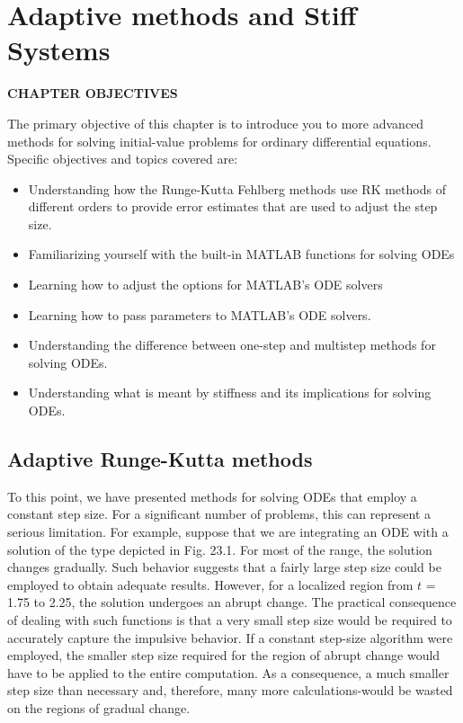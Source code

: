 \documentclass[../main.tex]{subfiles}
\begin{document}
 
\chapter{Adaptive methods and Stiff Systems}\label{chap:chap23}

\begin{center}
    \Large{\textbf{CHAPTER OBJECTIVES}}
\end{center}
The primary objective of this chapter is to introduce you to more advanced methods
for solving initial-value problems for ordinary differential equations. Specific
objectives and topics covered are:
\begin{itemize}
    \item Understanding how the Runge-Kutta Fehlberg methods use RK methods of
    different orders to provide error estimates that are used to adjust the step size.
    \item Familiarizing yourself with the built-in MATLAB functions for solving ODEs
    \item Learning how to adjust the options for MATLAB's ODE solvers
    \item Learning how to pass parameters to MATLAB's ODE solvers.
    \item Understanding the difference between one-step and multistep methods for solving
    ODEs.
    \item Understanding what is meant by stiffness and its implications for solving ODEs.
    \end{itemize}
\vspace{2cm}
\section{Adaptive Runge-Kutta methods}
To this point, we have presented methods for solving ODEs that employ a constant step size.
For a significant number of problems, this can represent a serious limitation. For example,
suppose that we are integrating an ODE with a solution of the type depicted in Fig. 23.1. For
most of the range, the solution changes gradually. Such behavior suggests that a fairly large
step size could be employed to obtain adequate results. However, for a localized region from
$t$ = 1.75 to 2.25, the solution undergoes an abrupt change. The practical consequence of
dealing with such functions is that a very small step size would be required to accurately
capture the impulsive behavior. If a constant step-size algorithm were employed, the smaller
step size required for the region of abrupt change would have to be applied to the entire computation. As a consequence, a much smaller step size than necessary and, therefore, many
more calculations-would be wasted on the regions of gradual change.
\end{document}
